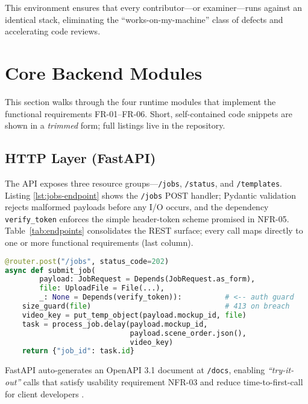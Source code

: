 This environment ensures that every contributor—or examiner—runs against an
identical stack, eliminating the “works-on-my-machine” class of defects and
accelerating code reviews.

\section{Core Backend Modules}
\label{sec:core-modules}

This section walks through the four runtime modules that implement the
functional requirements FR-01–FR-06. Short, self-contained code snippets are
shown in a \emph{trimmed} form; full listings live in the repository.

\subsection{HTTP Layer (FastAPI)}
\label{sec:fastapi}

The API exposes three resource groups—\texttt{/jobs}, \texttt{/status},
and \texttt{/templates}.  Listing \ref{lst:jobs-endpoint} shows the
\texttt{/jobs} POST handler; Pydantic validation rejects malformed payloads
before any I/O occurs, and the dependency \texttt{verify\_token} enforces the
simple header-token scheme promised in NFR-05.
Table~\ref{tab:endpoints} consolidates the REST surface; every call maps
directly to one or more functional requirements (last column).

\begin{lstlisting}[language=python,caption={Trimmed
  \texttt{/jobs} endpoint (implements FR-01, 05)},
  label={lst:jobs-endpoint},basicstyle=\scriptsize\ttfamily]
@router.post("/jobs", status_code=202)
async def submit_job(
        payload: JobRequest = Depends(JobRequest.as_form),
        file: UploadFile = File(...),
        _: None = Depends(verify_token)):          # <-- auth guard
    size_guard(file)                               # 413 on breach
    video_key = put_temp_object(payload.mockup_id, file)
    task = process_job.delay(payload.mockup_id,
                             payload.scene_order.json(),
                             video_key)
    return {"job_id": task.id}
\end{lstlisting}

FastAPI auto-generates an OpenAPI 3.1 document at
\texttt{/docs}, enabling \emph{“try-it-out”} calls that satisfy usability
requirement NFR-03 and reduce time-to-first-call for client developers
\cite{swaggerStudy}.

